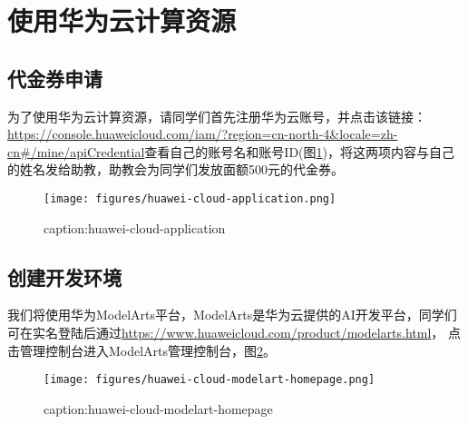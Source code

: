 




\section{使用华为云计算资源}\label{sec:huawei-cloud-usage}


\subsection{代金券申请}

为了使用华为云计算资源，请同学们首先注册华为云账号，并点击该链接：
\url{https://console.huaweicloud.com/iam/?region=cn-north-4&locale=zh-cn#/mine/apiCredential}查看自己的账号名和账号ID(图\ref{fig:huawei-cloud-application})，将这两项内容与自己的姓名发给助教，助教会为同学们发放面额500元的代金券。

\begin{figure}[htbp]
	\centering
	\texttt{[image: figures/huawei-cloud-application.png]}
	\caption{caption:huawei-cloud-application}
	\label{fig:huawei-cloud-application}
\end{figure}

\subsection{创建开发环境}

我们将使用华为ModelArts平台，ModelArts是华为云提供的AI开发平台，同学们可在实名登陆后通过\url{https://www.huaweicloud.com/product/modelarts.html}， 点击管理控制台进入ModelArts管理控制台，图\ref{fig:huawei-cloud-modelart-homepage}。
\begin{figure}[htbp]
	\centering
	\texttt{[image: figures/huawei-cloud-modelart-homepage.png]}
	\caption{caption:huawei-cloud-modelart-homepage}
	\label{fig:huawei-cloud-modelart-homepage}
\end{figure}

